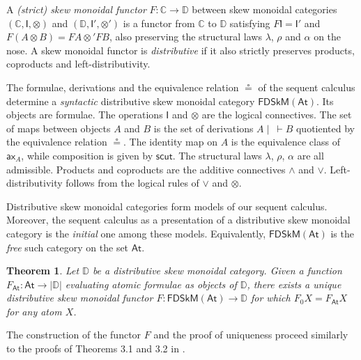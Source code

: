 \documentclass[submission,copyright,creativecommons]{eptcs}
\newtheorem{theorem}{Theorem}[section]
\theoremstyle{definition}
\newcommand{\ax}{\mathsf{ax}}
\newcommand{\ot}{\otimes}
\newcommand{\I}{\mathsf{I}}
\newcommand{\FSkMCC}{\mathsf{FDSkM}}
\begin{document}
A \emph{(strict) skew monoidal functor} $F : \mathbb{C} \rightarrow \mathbb{D}$ between skew monoidal categories $(\mathbb{C} , \I , \ot)$ and $(\mathbb{D} , \I' , \ot')$ is a functor from $\mathbb{C}$ to $\mathbb{D}$ satisfying
    $F \I = \I'$ and $F (A \ot B) = F A \ot' F B$, also preserving the structural laws $\lambda$, $\rho$ and $\alpha$ on the nose. A skew monoidal functor is \emph{distributive} if it also strictly preserves products, coproducts and left-distributivity.

The formulae, derivations and the equivalence relation $\circeq$ of the sequent calculus determine a \emph{syntactic} distributive skew monoidal category $\FSkMCC(\mathsf{At})$. Its objects are formulae. The operations $\I$ and $\ot$ are the logical connectives. The set of maps between objects $A$ and $B$ is the set of derivations $A \mid ~ \vdash B$ quotiented by the equivalence relation $\circeq$. The identity map on $A$ is the equivalence class of $\ax_A$, while composition is given by $\mathsf{scut}$. The structural laws $\lambda$, $\rho$, $\alpha$ are all admissible. Products and coproducts are the additive connectives $\land$ and $\lor$. Left-distributivity follows from the logical rules of $\lor$ and $\ot$.

Distributive skew monoidal categories form models of our sequent calculus.
Moreover, the sequent calculus as a presentation of a distributive skew monoidal category is the \emph{initial} one among these
models. Equivalently, $\FSkMCC(\mathsf{At})$ is the \emph{free}
such category on the set $\mathsf{At}$.
\begin{theorem}\label{thm:models}
  Let $\mathbb{D}$ be a distributive skew monoidal category. Given a function $F_{\mathsf{At}} : \mathsf{At} \rightarrow |\mathbb{D}|$ evaluating atomic formulae as objects of $\mathbb{D}$, there exists a unique distributive skew monoidal functor $F : \FSkMCC(\mathsf{At}) \rightarrow \mathbb{D}$ for which $F_0 X = F_{\mathsf{At}} X$ for any atom $X$.
\end{theorem}
The construction of the functor $F$ and the proof of uniqueness proceed similarly to the proofs of Theorems 3.1 and 3.2 in \cite{UVW:protsn}.
\end{document}
